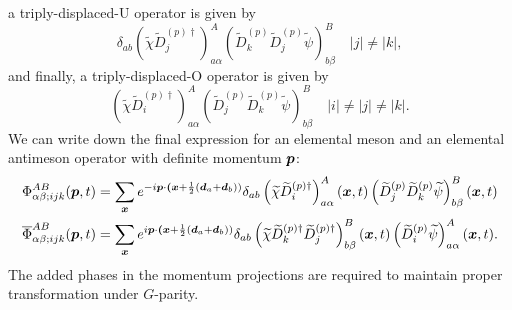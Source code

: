     a triply-displaced-U operator is given by
    \begin{equation}
        \delta_{a b}\left(\widetilde{\chi} \widetilde{D}_{j}^{(p) \dagger}\right)_{a \alpha}^{A}\left(\widetilde{D}_{k}^{(p)} \widetilde{D}_{j}^{(p)} \widetilde{\psi}\right)_{b \beta}^{B} \quad|j| \neq|k|,
    \end{equation}
    and finally, a triply-displaced-O operator is given by
    \begin{equation}
        \left(\widetilde{\chi} \widetilde{D}_{i}^{(p) \dagger}\right)_{a \alpha}^{A}\left(\widetilde{D}_{j}^{(p)} \widetilde{D}_{k}^{(p)} \widetilde{\psi}\right)_{b \beta}^{B} \quad|i| \neq|j| \neq|k|.
    \end{equation}
    We can write down the final expression for an elemental meson and an elemental antimeson operator with definite momentum $\boldsymbol{p}$:
    \begin{equation}
        \begin{aligned}
            \Phi_{\alpha \beta ; i j k}^{A B}(\boldsymbol{p}, t)&=\sum_{\boldsymbol{x}} e^{-i\boldsymbol{p} \cdot \boldsymbol{(}\boldsymbol{x}+\frac{1}{2}(\boldsymbol{d}_a + \boldsymbol{d}_b))}\delta_{a b}\left(\widetilde{\chi} \widetilde{D}_{i}^{(p) \dagger}\right)_{a \alpha}^{A}(\boldsymbol{x}, t)\left(\widetilde{D}_{j}^{(p)} \widetilde{D}_{k}^{(p)} \widetilde{\psi}\right)_{b \beta}^{B}(\boldsymbol{x}, t) \\
            \overline{\Phi}_{\alpha \beta ; i j k}^{A B}(\boldsymbol{p}, t)&=\sum_{\boldsymbol{x}} e^{i\boldsymbol{p} \cdot \boldsymbol{(}\boldsymbol{x}+\frac{1}{2}(\boldsymbol{d}_a + \boldsymbol{d}_b))}\delta_{a b}\left(\widetilde{\chi} \widetilde{D}_{k}^{(p) \dagger} \widetilde{D}_{j}^{(p) \dagger}\right)_{b \beta}^{B}(\boldsymbol{x}, t)\left(\widetilde{D}_{i}^{(p)} \widetilde{\psi}\right)_{a \alpha}^{A}(\boldsymbol{x}, t).
        \end{aligned}
    \end{equation}
    The added phases in the momentum projections are required to maintain proper transformation under $G$-parity.
